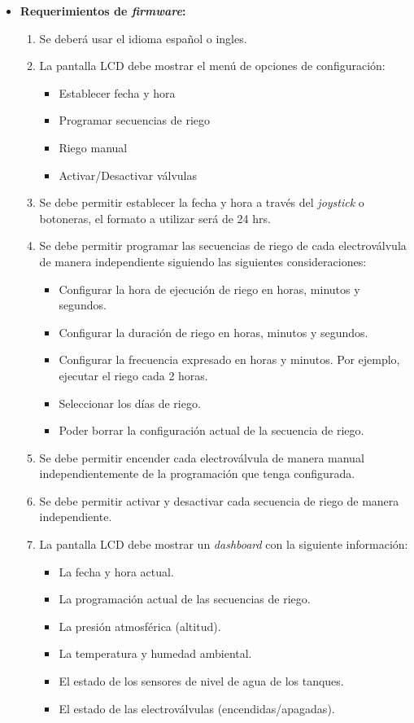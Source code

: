 \begin{itemize}
		\item \textbf{Requerimientos de \textit{firmware}:}
			\begin{enumerate}	
				\item Se deberá usar el idioma español o ingles.
				\item La pantalla LCD debe mostrar el menú de opciones de configuración:
					\begin{itemize}
						\item Establecer fecha y hora
						\item Programar secuencias de riego
						\item Riego manual
						\item Activar/Desactivar válvulas
					\end{itemize}
				\item Se debe permitir establecer la fecha y hora a través del \textit{joystick} o botoneras, el formato a utilizar será de 24 hrs.
				\item Se debe permitir programar las secuencias de riego de cada electroválvula de manera independiente siguiendo las siguientes consideraciones:
					\begin{itemize}
						\item Configurar la hora de ejecución de riego en horas, minutos y segundos.
						\item Configurar la duración de riego en horas, minutos y segundos.
						\item Configurar la frecuencia expresado en horas y minutos. Por ejemplo, ejecutar el riego cada 2 horas.
						\item Seleccionar los días de riego.
						\item Poder borrar la configuración actual de la secuencia de riego.
					\end{itemize}		
				\item Se debe permitir encender cada electroválvula de manera manual independientemente de la programación que tenga configurada.
				\item Se debe permitir activar y desactivar cada secuencia de riego de manera independiente.
				\item La pantalla LCD debe mostrar un \textit{dashboard} con la siguiente información:
					\begin{itemize}
						\item La fecha y hora actual.
						\item La programación actual de las secuencias de riego.
						\item La presión atmosférica (altitud).
						\item La temperatura y humedad ambiental.
						\item El estado de los sensores de nivel de agua de los tanques.
						\item El estado de las electroválvulas (encendidas/apagadas).
					\end{itemize}
			\end{enumerate}
	\end{itemize}

